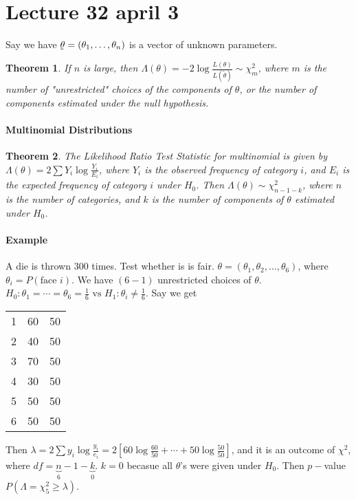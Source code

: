 \documentclass[10pt,letter]{article}
\theoremstyle{plain}
\newtheorem*{theorem*}{Theorem}
\theoremstyle{definition}
\begin{document}
\section*{Lecture 32 april 3}
Say we have $\underaccent{\tilde}{\theta}=(\theta_1,\ldots,\theta_n)$ is a vector of unknown parameters. 

\begin{theorem*}
    If $n$ is large, then $\Lambda(\theta)=-2\log\frac{L(\theta)}{L(\tilde{\theta})}\sim\chi^2_m$, where $m$ is the number of "unrestricted" choices of the components of $\theta$, or the number of components estimated under the null hypothesis.  
\end{theorem*}


\paragraph{Multinomial Distributions}
\begin{theorem*}
     The Likelihood Ratio Test Statistic for multinomial is given by $\Lambda(\theta)=2\sum Y_i\log\frac{Y_i}{E_i}$, where $Y_i$ is the observed frequency of category $i$, and $E_i$ is the expected frequency of category $i$ under $H_0$. Then $\Lambda(\theta)\sim\chi^2_{n-1-k}$, where $n$ is the number of categories, and $k$ is the number of components of $\theta$ estimated under $H_0$. 
\end{theorem*}
\paragraph{Example}
A die is thrown 300 times. Test whether is is fair. $\theta=(\theta_1,\theta_2,\ldots,\theta_6)$, where $\theta_i=P(\text{face }i)$. We have $(6-1)$ unrestricted choices of $\theta$. $H_0:\theta_1=\cdots=\theta_6=\frac{1}{6}\text{ vs }H_1:\theta_i\neq\frac{1}{6}$. Say we get
\begin{tabular}{|c|c|c|}\hline
1 & 60 & 50\\
2 & 40 & 50\\
3 & 70 & 50\\
4 & 30 & 50\\
5 & 50 & 50\\
6 & 50 & 50\\\hline
\end{tabular}
Then $\lambda=2\sum y_i\log\frac{y_i}{e_i}=2[60\log\frac{60}{50}+\cdots+50\log\frac{50}{50}]$, and it is an outcome of $\chi^2$, where $df=\underbrace{n}_6-1-\underbrace{k}_0$. $k=0$ becasue all $\theta$'s were given under $H_0$. Then $p-$value $P(\Lambda=\chi^2_5\geq\lambda)$. 
\end{document}

